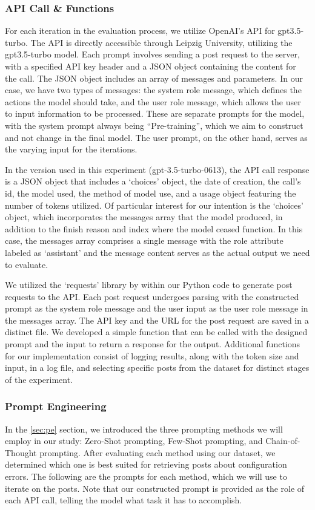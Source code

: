 \documentclass[english,bachelor]{swsLeipzig}
\begin{document}
\subsubsection{API Call \& Functions}
For each iteration in the evaluation process, we utilize OpenAI's API for gpt3.5-turbo. The API is directly accessible 
through Leipzig University, utilizing the gpt3.5-turbo model. Each prompt involves sending a post request to the server, with a specified API key header and a JSON object containing the content for the call. The JSON object includes an array of messages and parameters. In our case, we have two types of messages: the system role message, which defines the actions the model should take, and the user role message, which allows the user to input information to be processed. These are separate prompts for the model, with the system prompt always being ``Pre-training'', which we aim to construct and not change in the final model. The user prompt, on the other hand, serves as the varying input for the iterations.

In the version used in this experiment (gpt-3.5-turbo-0613), the API call response is a JSON object that includes a 
`choices' object, the date of creation, the call's id, the model used, the method of model use, and a usage object featuring the number of tokens utilized. Of particular interest for our intention is the `choices' object, which incorporates the messages array that the model produced, in addition to the finish reason and index where the model ceased function. In this case, the messages array comprises a single message with the role attribute labeled as `assistant' and the message content serves as the actual output we need to evaluate.

We utilized the `requests' library by \citeauthor{reitz:nd} within our Python code to generate post requests to the API. 
Each post request undergoes parsing with the constructed prompt as the system role message and the user input as the user role message in the messages array. The API key and the URL for the post request are saved in a distinct file. We developed a simple function that can be called with the designed prompt and the input to return a response for the output. Additional functions for our implementation consist of logging results, along with the token size and input, in a log file, and selecting specific posts from the dataset for distinct stages of the experiment.

\subsubsection{Prompt Engineering}
In the \ref{sec:pe} section, we introduced the three prompting methods we will employ in our study: 
Zero-Shot prompting, Few-Shot prompting, and Chain-of-Thought prompting. After evaluating each method using our dataset, we determined which one is best suited for retrieving posts about configuration errors. The following are the prompts for each method, which we will use to iterate on the posts. Note that our constructed prompt is provided as the role of each API call, telling the model what task it has to accomplish.
\end{document}

